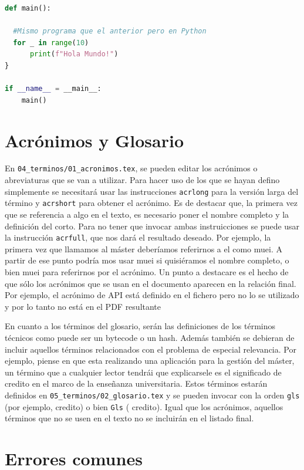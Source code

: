 \begin{lstlisting}[language=Python]
def main():

  #Mismo programa que el anterior pero en Python
  for _ in range(10)
      print(f"Hola Mundo!")
}

if __name__ = __main__:
    main()   
\end{lstlisting}

\section{Acrónimos y Glosario}

En \texttt{04\_terminos/01\_acronimos.tex}, se pueden editar los acrónimos 
o abreviaturas que se van a utilizar. Para hacer uso de los que 
se hayan defino simplemente se necesitará usar las instrucciones 
\texttt{acrlong} para la versión larga del término y \texttt{acrshort}
para obtener el acrónimo. Es de destacar que, la primera vez que se 
referencia a algo en el texto, es necesario poner el nombre completo y 
la definición del corto. Para no tener que invocar ambas instruicciones 
se puede usar la instrucción \texttt{acrfull}, que nos dará el resultado
deseado. Por ejemplo, la primera vez que llamamos al máster deberíamos referirnos
a el como \acrfull{muei}. A partir de ese punto podría mos usar 
\acrlong{muei} si quisiéramos el nombre completo, o bien \acrshort{muei}
para referirnos por el acrónimo. Un punto a destacare es el hecho de que sólo 
los acrónimos que se usan en el documento aparecen en la relación final.
Por ejemplo, el acrónimo de API está definido en el fichero pero no lo 
se utilizado y por lo tanto no está en el PDF resultante

En cuanto a los términos del glosario, serán las definiciones de los
términos técnicos como puede ser un bytecode o un hash. Además también 
se debieran de incluir aquellos términos relacionados con el problema 
de especial relevancia.
Por ejemplo, piense en que esta realizando una  aplicación para la gestión 
del máster, un término que a cualquier lector tendrái que explicarsele es
el significado de \gls{credito} en el marco de la enseñanza universitaria.
Estos términos estarán definidos en \texttt{05\_terminos/02\_glo\-sa\-rio.tex} 
y se pueden invocar con la orden \texttt{gls} (por ejemplo, \gls{credito}) 
o bien \texttt{Gls} ( \Gls{credito}). Igual que los acrónimos, aquellos 
términos que no se usen en el texto no se incluirán en el listado final.

\section{Errores comunes}

